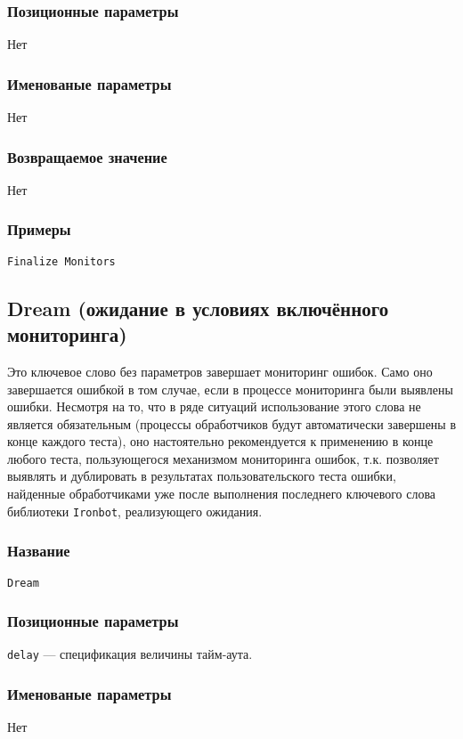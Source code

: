 \documentclass[11pt]{book} %
\begin{document}
\subsubsection*{Позиционные параметры} 
Нет

\subsubsection*{Именованые параметры} 
Нет

\subsubsection*{Возвращаемое значение} 
Нет

\subsubsection*{Примеры}
\begin{verbatim}Finalize Monitors\end{verbatim}




\subsection{Dream (ожидание в условиях включённого мониторинга)}
    Это ключевое слово без параметров завершает мониторинг ошибок. Само оно завершается ошибкой в том случае, если в процессе мониторинга были выявлены ошибки. Несмотря на то, что в ряде ситуаций использование этого слова не является обязательным (процессы обработчиков будут автоматически завершены в конце каждого теста), оно настоятельно рекомендуется к применению в конце любого теста, пользующегося механизмом мониторинга ошибок, т.к. позволяет выявлять и дублировать в результатах пользовательского теста ошибки, найденные обработчиками уже после выполнения последнего ключевого слова библиотеки \verb|Ironbot|, реализующего ожидания.

\subsubsection*{Название} 
\verb"Dream"

\subsubsection*{Позиционные параметры} 
\verb|delay| --- спецификация величины тайм-аута.

\subsubsection*{Именованые параметры} 
Нет
\end{document}

